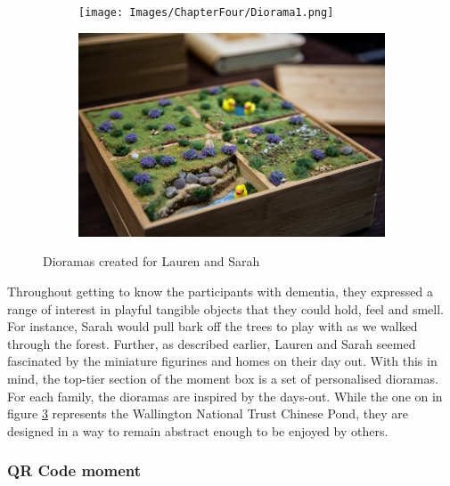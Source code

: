 \begin{figure}[htp]
\centering
\begin{subfigure}{.5\textwidth}
  \centering
  \texttt{[image: Images/ChapterFour/Diorama1.png]}
  \label{fig:DiroamaOne}
\end{subfigure}%
\begin{subfigure}{.5\textwidth}
  \centering
  \includegraphics[width=.8\linewidth]{Images/ChapterFour/Diroama2.png}
  \label{fig:DiroamaTwo}
\end{subfigure}
\caption{Dioramas created for Lauren and Sarah}
\label{fig:Dioramas}
\end{figure}

Throughout getting to know the participants with dementia, they expressed a range of interest in playful tangible objects that they could hold, feel and smell. For instance, Sarah would pull bark off the trees to play with as we walked through the forest. Further, as described earlier, Lauren and Sarah seemed fascinated by the miniature figurines and homes on their day out. With this in mind, the top-tier section of the moment box is a set of personalised dioramas. For each family, the dioramas are inspired by the days-out. While the one on in figure \ref{fig:Dioramas} represents the Wallington National Trust Chinese Pond, they are designed in a way to remain abstract enough to be enjoyed by others. 

\subsubsection{QR Code moment}
\label{QR-Code-Moments}

